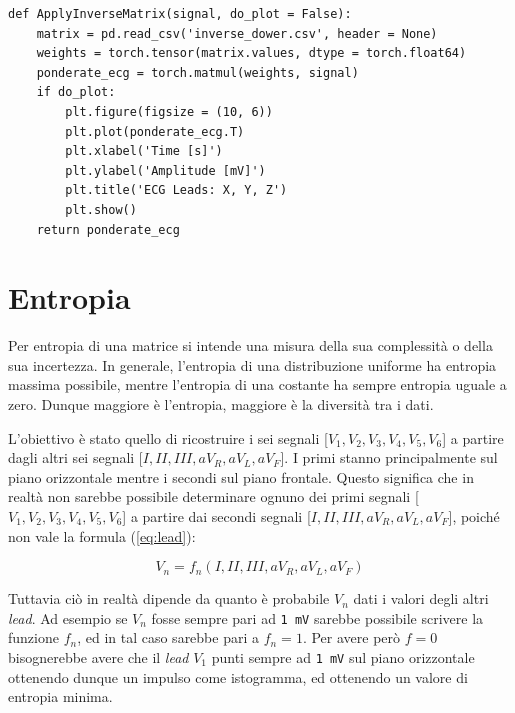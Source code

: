 \lstset{language=Python}
\begin{lstlisting}[aboveskip=15pt, belowskip=15pt, basicstyle=\fontsize{8}{10}\selectfont, keywordstyle=\color{blue}, breaklines=true, label=snippet:dower]
def ApplyInverseMatrix(signal, do_plot = False):
    matrix = pd.read_csv('inverse_dower.csv', header = None)
    weights = torch.tensor(matrix.values, dtype = torch.float64)
    ponderate_ecg = torch.matmul(weights, signal)
    if do_plot:
        plt.figure(figsize = (10, 6))
        plt.plot(ponderate_ecg.T)
        plt.xlabel('Time [s]')
        plt.ylabel('Amplitude [mV]')
        plt.title('ECG Leads: X, Y, Z')
        plt.show()
    return ponderate_ecg
\end{lstlisting}

\section{Entropia}
\label{sec:entropia}

Per entropia di una matrice si intende una misura della sua complessità o della sua incertezza. In generale, l’entropia di una distribuzione uniforme ha entropia massima possibile, mentre l'entropia di una costante ha sempre entropia uguale a zero. Dunque maggiore è l’entropia, maggiore è la diversità tra i dati.

L'obiettivo è stato quello di ricostruire i sei segnali [$ V_{1}, V_{2}, V_{3}, V_{4}, V_{5}, V_{6} $] a partire dagli altri sei segnali [$ I, II, III, aV_{R}, aV_{L}, aV_{F} $]. I primi stanno principalmente sul piano orizzontale mentre i secondi sul piano frontale. Questo significa che in realtà non sarebbe possibile determinare ognuno dei primi segnali [$ V_{1}, V_{2}, V_{3}, V_{4}, V_{5}, V_{6} $] a partire dai secondi segnali [$ I, II, III, aV_{R}, aV_{L}, aV_{F} $], poiché non vale la formula (\ref{eq:lead}):

\begin{equation}
    V_{n} = f_{n}(I, II, III, aV_{R}, aV_{L}, aV_{F})
    \label{eq:lead}
\end{equation}

Tuttavia ciò in realtà dipende da quanto è probabile $ V_{n} $ dati i valori degli altri \textit{lead}. Ad esempio se $ V_{n} $ fosse sempre pari ad \texttt{1 mV} sarebbe possibile scrivere la funzione $ f_{n} $, ed in tal caso sarebbe pari a $ f_{n} = 1 $. Per avere però $ f = 0 $ bisognerebbe avere che il \textit{lead} $ V_{1} $ punti sempre ad \texttt{1 mV} sul piano orizzontale ottenendo dunque un impulso come istogramma, ed ottenendo un valore di entropia minima.

